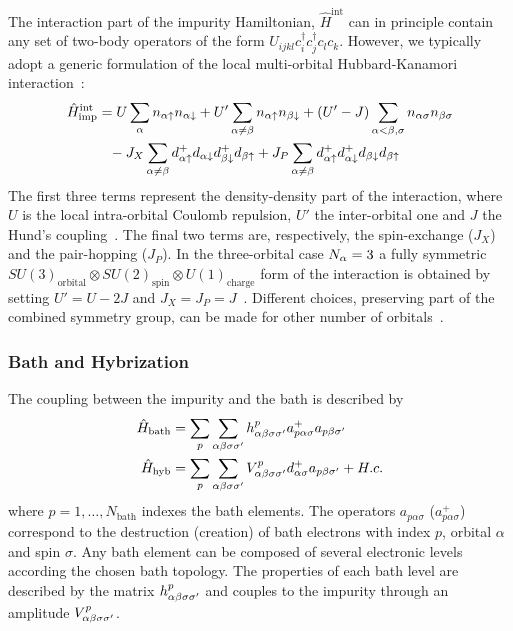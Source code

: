 \documentclass[edipack2.tex]{subfiles}
\begin{document}
The interaction part of the impurity Hamiltonian, 
 $\hat{H}^{\mathrm{int}}$ can in principle contain any 
set of two-body operators of the form
$U_{ijkl}c^{\dagger}_{i}c^{\dagger}_{j}c_{l}c_{k}$.
However, we typically 
adopt a generic formulation of the local multi-orbital Hubbard-Kanamori interaction~\cite{Georges2013ACMP}:
\begin{equation}\label{Hint}
  \begin{split}
    \hat{H}^\mathrm{int}_\mathrm{imp} &=U\sum_{\a}n_{\a\uparrow}n_{\a\downarrow}+U'\sum_{\a\neq \b}n_{\a\uparrow}n_{\b\downarrow}+(U'-J)\sum_{\a<\b,\sigma}n_{\a\sigma}n_{\b\sigma}\\
    &{\phantom =}- J_X\sum_{\a\neq
      \b}d^{+}_{\a\uparrow}d_{\a\downarrow}d^{+}_{\b\downarrow}d_{\b\uparrow}+J_P\sum_{\a
      \neq
      \b}d^{+}_{\a\uparrow}d^{+}_{\a\downarrow}d_{\b\downarrow}d_{\b\uparrow}\\
\end{split}
\end{equation}
The first three terms represent the density-density part of the
interaction, where $U$ is the local intra-orbital Coulomb repulsion,
$U'$ the inter-orbital one and $J$ the Hund's coupling~\cite{Georges2013ACMP}.  
The final two terms are, respectively, the spin-exchange ($J_X$) and
the pair-hopping ($J_P$).
In the three-orbital case $N_\alpha=3$ a fully symmetric $SU(3)_\mathrm{orbital}\otimes SU(2)_\mathrm{spin}\otimes
U(1)_\mathrm{charge}$ form of the interaction is obtained by setting $U'=U-2J$ and
$J_X=J_P=J$~\cite{Georges2013ACMP}. Different choices, preserving part
of the combined symmetry group, can be made for other number of orbitals~\cite{Georges2013ACMP}.

\subsubsection{Bath and Hybrization}
The coupling between the impurity and the bath is described by
\begin{equation}\label{Hbath}
  \begin{split}
    \hat{H}_\mathrm{bath} &=
    \sum_p\sum_{\alpha\beta\sigma\sigma'}h^p_{\alpha\beta\sigma\sigma'}a^{+}_{p\alpha\sigma}a_{p\beta\sigma'}\\
    \hat{H}_\mathrm{hyb} &= \sum_p\sum_{\alpha\beta\sigma\sigma'}V^p_{\alpha\beta\sigma\sigma'}d^{+}_{\alpha\sigma}a_{p\beta\sigma'}+H.c. \\
\end{split}
\end{equation}
where $p=1,\dots,N_\mathrm{bath}$ indexes the
bath elements. The operators $a_{p\alpha\sigma}$
($a^+_{p\alpha\sigma}$) correspond to the destruction (creation) of
bath electrons with index $p$, orbital $\alpha$ and spin $\sigma$.
Any bath element can be composed of several electronic levels
according the chosen bath topology. The  properties of each bath level are described by the
matrix $h^p_{\alpha\beta\sigma\sigma'}$ and couples to the impurity through an amplitude
$V^p_{\alpha\beta\sigma\sigma'}$.   
\end{document}
